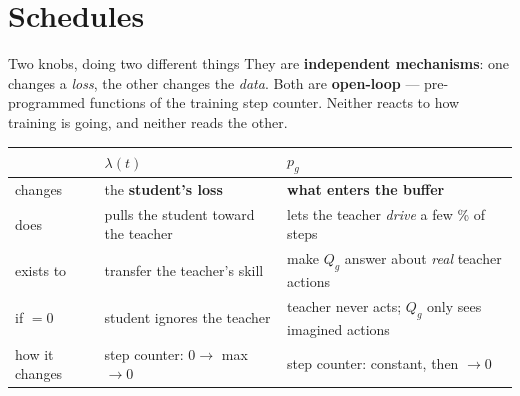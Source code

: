\documentclass[aspectratio=169]{beamer}
\begin{document}
\section{Schedules}

\begin{frame}{Two knobs, doing two different things}
  \relax
  {\footnotesize They are \textbf{independent mechanisms}: one changes a \emph{loss}, the other
  changes the \emph{data}. Both are \textbf{open-loop} --- pre-programmed functions of the
  training step counter. Neither reacts to how training is going, and neither reads the other.}
  \vspace{0.5em}
  \begin{center}\footnotesize
  \begin{tabular}{p{2.0cm} p{4.7cm} p{4.7cm}}
    \toprule
     & \textcolor{cAccent}{\textbf{$\lambda(t)$}} & \textcolor{cGuide}{\textbf{$p_g$}} \\
    \midrule
    changes & the \textbf{student's loss} & \textbf{what enters the buffer} \\[2pt]
    does & pulls the student toward the teacher & lets the teacher \emph{drive} a few \% of steps \\[2pt]
    exists to & transfer the teacher's skill & make $Q_g$ answer about \emph{real} teacher actions \\[2pt]
    if $=0$ & student ignores the teacher & teacher never acts; $Q_g$ only sees imagined actions \\[2pt]
    how it changes & step counter: $0 \to$ max $\to 0$ & step counter: constant, then $\to 0$ \\
    \bottomrule
  \end{tabular}
  \end{center}
\end{frame}
\end{document}

